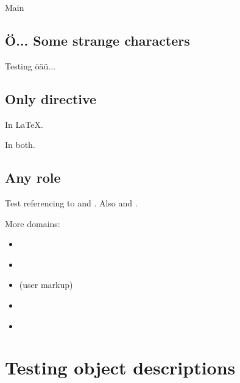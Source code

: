 \documentclass[letterpaper,10pt,english]{sphinxmanual}
\begin{document}
Main


\section{Ö... Some strange characters}
\label{markup:olabel}\label{markup:o-some-strange-characters}
Testing öäü...


\section{Only directive}
\label{markup:only-directive}
In LaTeX.

In both.


\section{Any role}
\label{markup:any-role}
Test referencing to {\hyperref[markup:with]{}} and {\hyperref[objects:func_without_body]{}}.
Also {\hyperref[objects:module\string-mod]{}} and {\hyperref[objects:Time]{}}.

More domains:
\begin{itemize}
\item {} 
{\hyperref[objects:bar.baz]{}}

\item {} 
{\hyperref[objects:c.SphinxType]{}}

\item {} 
{\hyperref[objects:userdesc\string-myobj]{}} (user markup)

\item {} 
{\hyperref[objects:_CPPv2N1n5ArrayE]{}}

\item {} 
{\hyperref[objects:cmdoption\string-perl\string-c]{}}

\end{itemize}


\chapter{Testing object descriptions}
\label{objects:testing-object-descriptions}\label{objects::doc}
\end{document}
